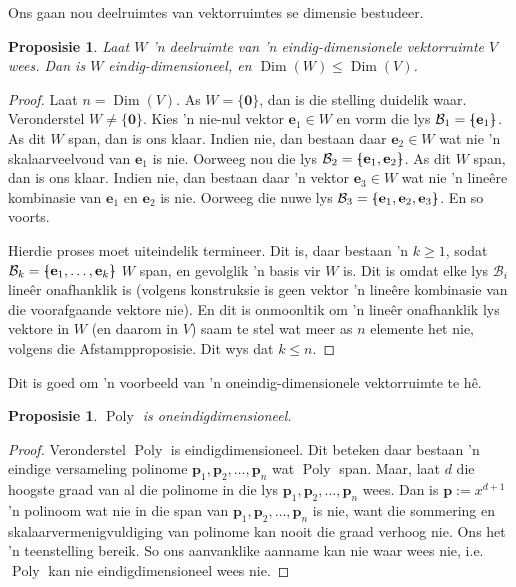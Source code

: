\documentclass[a4paper,11pt]{book}
\newtheorem{proposition}[theorem]{Proposisie}
\theoremstyle{definition}
\newcommand{\ve}[1]{\mathbf{#1}}
\newcommand{\basis}[1]{{\mathcal #1}}
\newcommand{\bmark}{\raisebox{.53ex}{\rule{.2em}{.1ex}}}
\newcommand{\bopen}{{\protect\ooalign{\{\cr\hfil\bmark\hfil\cr}}}
\newcommand{\bclose}{{\protect\ooalign{\}\cr\hfil\bmark\hfil\cr}}}
\DeclareMathOperator{\Poly}{Poly}
\DeclareMathOperator{\Dim}{Dim}
\begin{document}
Ons gaan nou deelruimtes van vektorruimtes se dimensie bestudeer.

\begin{proposition} Laat $W$ 'n deelruimte van 'n eindig-dimensionele
	vektorruimte $V$ wees. Dan is $W$ eindig-dimensioneel, en $\Dim(W) \leq
	\Dim(V)$. \label{dim-of-subspace-prop}
\end{proposition}
\begin{proof} Laat $n = \Dim(V)$. As $W = \{ \ve{0} \}$, dan is die
	stelling duidelik waar. Veronderstel $W \neq \{ \ve{0} \}$. Kies 'n
	nie-nul vektor $\ve{e}_1 \in W$ en vorm die lys $\basis{B}_1 = \bopen
	\ve{e}_1 \bclose$. As dit $W$ span, dan is ons klaar. Indien nie, dan
	bestaan daar $\ve{e}_2 \in W$ wat nie 'n skalaarveelvoud van $\ve{e}_1$
	is nie. Oorweeg nou die lys $\basis{B}_2 = \bopen \ve{e}_1, \ve{e}_2
	\bclose$. As dit $W$ span, dan is ons klaar. Indien nie, dan bestaan
	daar 'n vektor $\ve{e}_3 \in W$ wat nie 'n line{\^e}re kombinasie van
	$\ve{e}_1$ en $\ve{e}_2$ is nie. Oorweeg die nuwe lys $\basis{B}_3 =
	\bopen \ve{e}_1, \ve{e}_2, \ve{e}_3 \bclose$. En so voorts.

	Hierdie proses moet uiteindelik termineer. Dit is, daar bestaan 'n $k
	\geq 1$, sodat $\basis{B}_k = \bopen \ve{e}_1, \ldots, \ve{e}_k
	\bclose$ $W$ span, en gevolglik 'n basis vir $W$ is. Dit is omdat elke
	lys $\basis{B}_i$ line{\^e}r onafhanklik is (volgens konstruksie is
	geen vektor 'n line{\^e}re kombinasie van die voorafgaande vektore
	nie).
	En dit is onmoonltik om 'n line{\^e}r onafhanklik lys vektore in $W$
	(en daarom in $V$) saam te stel wat meer as $n$ elemente het nie,
	volgens die Afstampproposisie. Dit wys dat $k \leq n$. 
\end{proof}

Dit is goed om 'n voorbeeld van 'n oneindig-dimensionele vektorruimte te
h{\^e}.

\begin{proposition} $\Poly$ is oneindigdimensioneel.
\end{proposition}
\begin{proof} Veronderstel $\Poly$ is eindigdimensioneel. Dit beteken daar
	bestaan 'n eindige versameling polinome $\ve{p}_1, \ve{p}_2, \ldots,
	\ve{p}_n$ wat $\Poly$ span. Maar, laat $d$ die hoogste graad van al die
	polinome in die lys $\ve{p}_1, \ve{p}_2, \ldots, \ve{p}_n$ wees. Dan is
	$\ve{p} := x^{d+1}$ 'n polinoom wat nie in die span van $\ve{p}_1,
	\ve{p}_2, \ldots, \ve{p}_n$ is nie, want die sommering en
	skalaarvermenigvuldiging van polinome kan nooit die graad verhoog nie.
	Ons het 'n teenstelling bereik. So ons aanvanklike aanname kan nie waar
	wees nie, i.e. $\Poly$ kan nie eindigdimensioneel wees nie.
\end{proof}
\end{document}
